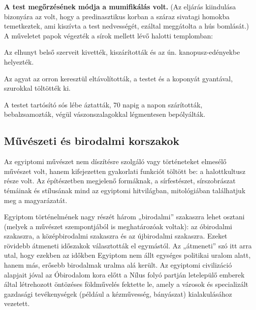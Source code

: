 	\textbf{A test megőrzésének módja a mumifikálás volt.} (Az eljárás kiindulása bizonyára az volt, hogy a predinasztikus korban a száraz sivatagi homokba temetkeztek, ami kiszívta a test nedvességét, ezáltal meggátolta a hús bomlását.) A műveletet papok végezték a sírok mellett lévő halotti templomban:
	\begin{compactitem}
		\item Az elhunyt belső szerveit kivették, kiszárították és az ún. kanopusz-edényekbe helyezték.
		\item Az agyat az orron keresztül eltávolították, a testet és a koponyát gyantával, szurokkal töltötték ki.
		\item A testet tartósító sós lébe áztatták, 70 napig a napon szárították, bebalzsamozták, végül vászonszalagokkal légmentesen bepólyálták.
	\end{compactitem}

\begin{figure}[!h]
	\begin{minipage}{0.49\textwidth}
		\centering
	\end{minipage}\hfill
	\begin{minipage}{0.45\textwidth}
		\centering
	\end{minipage}\hfill
	\captionsetup{labelformat=empty}
	\caption{}
\end{figure}

	

\subsection*{Művészeti és birodalmi korszakok}

	Az egyiptomi művészet nem díszítésre szolgáló vagy történeteket elmesélő művészet volt, hanem kifejezetten gyakorlati funkciót töltött be: a halottkultusz része volt. Az építészetben megjelenő formáknak, a sírfestészet, sírszobrászat témáinak és stílusának mind az egyiptomi hitvilágban, mitológiában találhatjuk meg a magyarázatát.

Egyiptom történelmének nagy részét három „birodalmi” szakaszra lehet osztani (melyek a művészet szempontjából is meghatározóak voltak): az óbirodalmi szakaszra, a középbirodalmi szakaszra és az újbirodalmi szakaszra. Ezeket rövidebb átmeneti időszakok választották el egymástól. Az „átmeneti” szó itt arra utal, hogy ezekben az időkben Egyiptom nem állt egységes politikai uralom alatt, hanem más, erősebb birodalmak uralma alá került. Az egyiptomi civilizáció alapjait jóval az Óbirodalom kora előtt a Nílus folyó partján letelepülő emberek által létrehozott öntözéses földművelés fektette le, amely a városok és specializált gazdasági tevékenységek (például a kézművesség, bányászat) kialakulásához vezetett.\\


